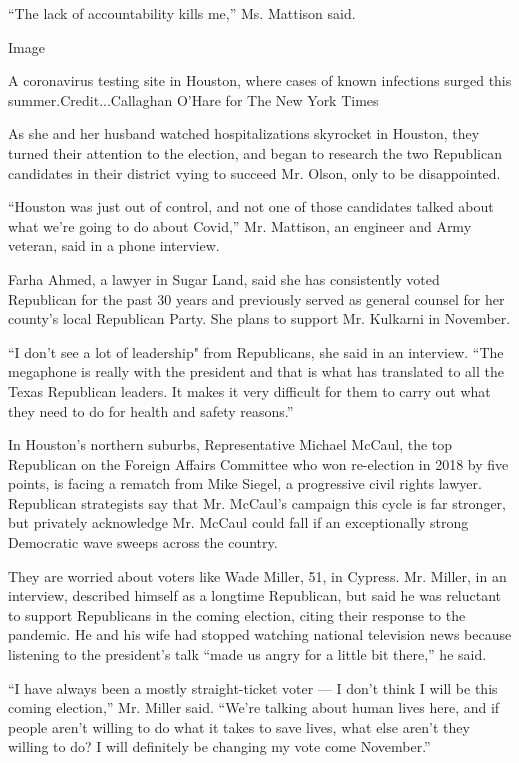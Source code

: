 ``The lack of accountability kills me,'' Ms. Mattison said.

Image

A coronavirus testing site in Houston, where cases of known infections
surged this summer.Credit...Callaghan O'Hare for The New York Times

As she and her husband watched hospitalizations skyrocket in Houston,
they turned their attention to the election, and began to research the
two Republican candidates in their district vying to succeed Mr. Olson,
only to be disappointed.

``Houston was just out of control, and not one of those candidates
talked about what we're going to do about Covid,'' Mr. Mattison, an
engineer and Army veteran, said in a phone interview.

Farha Ahmed, a lawyer in Sugar Land, said she has consistently voted
Republican for the past 30 years and previously served as general
counsel for her county's local Republican Party. She plans to support
Mr. Kulkarni in November.

``I don't see a lot of leadership" from Republicans, she said in an
interview. ``The megaphone is really with the president and that is what
has translated to all the Texas Republican leaders. It makes it very
difficult for them to carry out what they need to do for health and
safety reasons.''

In Houston's northern suburbs, Representative Michael McCaul, the top
Republican on the Foreign Affairs Committee who won re-election in 2018
by five points, is facing a rematch from Mike Siegel, a progressive
civil rights lawyer. Republican strategists say that Mr. McCaul's
campaign this cycle is far stronger, but privately acknowledge Mr.
McCaul could fall if an exceptionally strong Democratic wave sweeps
across the country.

They are worried about voters like Wade Miller, 51, in Cypress. Mr.
Miller, in an interview, described himself as a longtime Republican, but
said he was reluctant to support Republicans in the coming election,
citing their response to the pandemic. He and his wife had stopped
watching national television news because listening to the president's
talk ``made us angry for a little bit there,'' he said.

``I have always been a mostly straight-ticket voter --- I don't think I
will be this coming election,'' Mr. Miller said. ``We're talking about
human lives here, and if people aren't willing to do what it takes to
save lives, what else aren't they willing to do? I will definitely be
changing my vote come November.''

